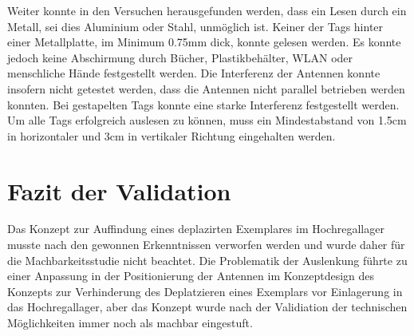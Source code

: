 Weiter konnte in den Versuchen herausgefunden werden, dass ein Lesen durch ein Metall, sei dies Aluminium oder Stahl, unmöglich ist. Keiner der Tags hinter einer Metallplatte, im Minimum 0.75mm dick, konnte gelesen werden. Es konnte jedoch keine Abschirmung durch Bücher, Plastikbehälter, WLAN oder menschliche Hände festgestellt werden. Die Interferenz der Antennen konnte insofern nicht getestet werden, dass die Antennen nicht parallel betrieben werden konnten. Bei gestapelten Tags konnte eine starke Interferenz festgestellt werden. Um alle Tags erfolgreich auslesen zu können, muss ein Mindestabstand von 1.5cm in horizontaler und 3cm in vertikaler Richtung eingehalten werden.

\section{Fazit der Validation}
Das Konzept zur Auffindung eines deplazirten Exemplares im Hochregallager musste nach den gewonnen Erkenntnissen verworfen werden und wurde daher für die Machbarkeitsstudie nicht beachtet. Die Problematik der Auslenkung führte zu einer Anpassung in der Positionierung der Antennen im Konzeptdesign des Konzepts zur Verhinderung des Deplatzieren eines Exemplars vor Einlagerung in das Hochregallager, aber das Konzept wurde nach der Validiation der technischen Möglichkeiten immer noch als machbar eingestuft.